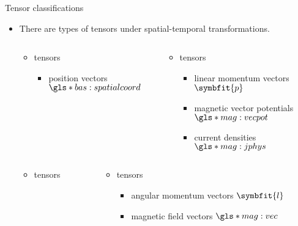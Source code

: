   \begin{frame}{Tensor classifications}
    \begin{itemize}
      \item<1-> There are  types of tensors under spatial-temporal transformations.
      \begin{columns}[T]
        \begin{column}{.45\textwidth}
          \begin{itemize}
            \item<1->   tensors
            \begin{itemize}
              \item position vectors $\gls*{bas:spatialcoord}$
            \end{itemize}
          \end{itemize}
        \end{column}
        \begin{column}{.45\textwidth}
          \begin{itemize}
            \item<1->   tensors
            \begin{itemize}
              \item linear momentum vectors $\symbfit{p}$
              \item magnetic vector potentials $\gls*{mag:vecpot}$
              \item current densities $\gls*{mag:jphys}$
            \end{itemize}
          \end{itemize}
        \end{column}
      \end{columns}

      \vspace{0.2cm}

      \begin{columns}[T]
        \begin{column}{.45\textwidth}
          \begin{itemize}
            \item<1->   tensors
          \end{itemize}
        \end{column}
        \begin{column}{.45\textwidth}
          \begin{itemize}
            \item<1->   tensors
            \begin{itemize}
              \item angular momentum vectors $\symbfit{l}$
              \item magnetic field vectors $\gls*{mag:vec}$
            \end{itemize}
          \end{itemize}
        \end{column}
      \end{columns}
    \end{itemize}


\end{frame}
